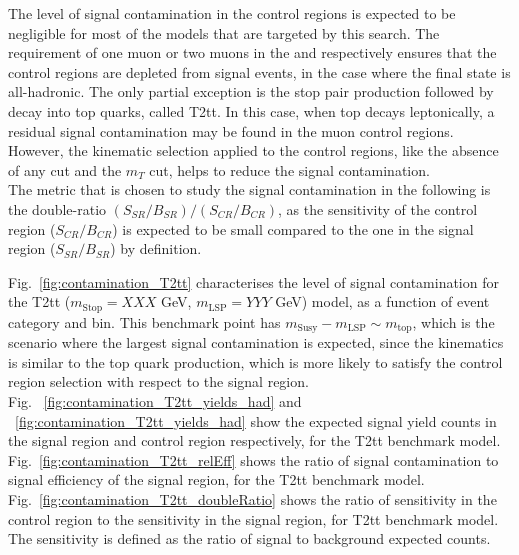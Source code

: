 The level of signal contamination in the control regions is expected to be
negligible for most of the models that are targeted by this search. The
requirement of one muon or two muons in the \mj and \mmj respectively ensures
that the control regions are depleted from signal events, in the case where the
final state is all-hadronic. The only partial exception is the stop pair
production followed by decay into top quarks, called T2tt. In this case, when
top decays leptonically, a residual signal contamination may be found in the
muon control regions. However, the kinematic selection applied to the control
regions, like the absence of any \alt cut and the $m_{T}$ cut, helps to reduce
the signal contamination. \\
The metric that is chosen to study the signal contamination in the following is
the double-ratio $(S_{SR}/B_{SR})/(S_{CR}/B_{CR})$, as the sensitivity of the
control region ($S_{CR}/B_{CR}$) is expected to be small compared to the one in
the signal region ($S_{SR}/B_{SR}$) by definition.

Fig.~\ref{fig:contamination_T2tt} characterises the level of signal
contamination for the T2tt ($m_{\mathrm{Stop}}=XXX$ GeV, $m_{\mathrm{LSP}}=YYY$ GeV)
model, as a function of event category and \scalht bin. This benchmark point
has $m_{\mathrm{Susy}}-m_{\mathrm{LSP}} \sim m_{\mathrm{top}}$, which is the
scenario where the largest signal contamination is expected, since the
kinematics is similar to the top quark production, which is more likely to
satisfy the control region selection with respect to the signal region. \\
Fig. ~\ref{fig:contamination_T2tt_yields_had} and
~\ref{fig:contamination_T2tt_yields_had} show the expected signal yield counts
in the signal region and \mj control region respectively, for the T2tt benchmark
model. Fig.~\ref{fig:contamination_T2tt_relEff} shows the ratio of signal
contamination to signal efficiency of the signal region, for the T2tt benchmark
model. Fig.~\ref{fig:contamination_T2tt_doubleRatio} shows the ratio of
sensitivity in the control region to the sensitivity in the signal region, for
T2tt benchmark model. The sensitivity is defined as the ratio of signal to
background expected counts.

